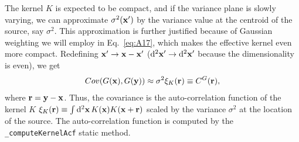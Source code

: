 \documentclass[DM,lsstdraft, authoryear,toc]{lsstdoc}
\newcommand{\rmd}{\mathrm{d}^2}
\begin{document}
The kernel $K$ is expected to be compact, and if the variance plane is slowly varying, we can approximate $\sigma^2({\bf x}')$ by the variance value at the centroid of the source, say $\sigma^2$. This approximation is further justified because of Gaussian weighting we will employ in Eq.~\ref{eq:A17}, which makes the effective kernel even more compact. Redefining ${\bf x}' \rightarrow {\bf x} - {\bf x}'$ ($\rmd{\bf x}' \rightarrow \rmd{\bf x}'$ because the dimensionality is even), we get
\begin{equation}
  Cov(G({\bf x}), G({\bf y})) \approx \sigma^2 \xi_K({\bf r}) \equiv C^G({\bf r}),
\end{equation}
where ${\bf r} = {\bf y}-{\bf x}$. Thus, the covariance is the auto-correlation function of the kernel $K$ $\xi_K({\bf r}) \equiv \int\rmd{\bf x}\, K({\bf x})K({\bf x}+{\bf r})$  scaled by the variance $\sigma^2$ at the location of the source. The auto-correlation function is computed by the \texttt{\_computeKernelAcf} static method.
\end{document}
